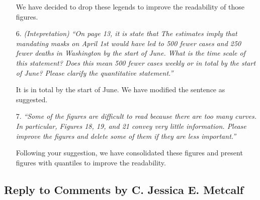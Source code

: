 \documentclass[11pt]{article}
\begin{document}
\begin{itemize}
We have decided to drop these legends to improve the readability of those figures. 

\item[6. ]  \textit{(Intepretation) ``On page 13, it is state that
The estimates imply that mandating masks on April 1st would have led to 500
fewer cases and 250 fewer deaths in Washington by the start of June.
What is the time scale of this statement? Does this mean 500 fewer cases weekly or in total
by the start of June? Please clarify the quantitative statement.''}

It is in total by the start of June. We have modified the sentence as suggested.  

\item[7.]  \textit{``Some of the figures are difficult to read because there are too many curves. In particular,
Figures 18, 19, and 21 convey very little information. Please improve the figures and delete
some of them if they are less important.''}

Following your suggestion, we have consolidated these figures and present figures with quantiles to improve the readability.

\end{itemize} 
 
\newpage

\replytitle
\subsection*{Reply to Comments by C. Jessica E. Metcalf }

\changes
\end{document}
